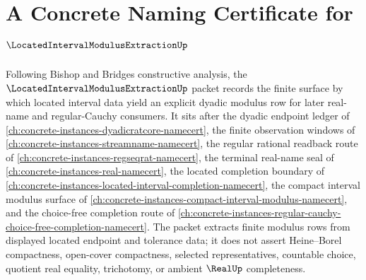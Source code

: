 \chapter{A Concrete Naming Certificate for $\LocatedIntervalModulusExtractionUp$}
\label{ch:concrete-instances-located-interval-modulus-extraction-namecert}

Following Bishop and Bridges constructive analysis, the $\LocatedIntervalModulusExtractionUp$ packet records the finite surface by which located interval data yield an explicit dyadic modulus row for later real-name and regular-Cauchy consumers. It sits after the dyadic endpoint ledger of \autoref{ch:concrete-instances-dyadicratcore-namecert}, the finite observation windows of \autoref{ch:concrete-instances-streamname-namecert}, the regular rational readback route of \autoref{ch:concrete-instances-regseqrat-namecert}, the terminal real-name seal of \autoref{ch:concrete-instances-real-namecert}, the located completion boundary of \autoref{ch:concrete-instances-located-interval-completion-namecert}, the compact interval modulus surface of \autoref{ch:concrete-instances-compact-interval-modulus-namecert}, and the choice-free completion route of \autoref{ch:concrete-instances-regular-cauchy-choice-free-completion-namecert}. The packet extracts finite modulus rows from displayed located endpoint and tolerance data; it does not assert Heine--Borel compactness, open-cover compactness, selected representatives, countable choice, quotient real equality, trichotomy, or ambient $\RealUp$ completeness.

